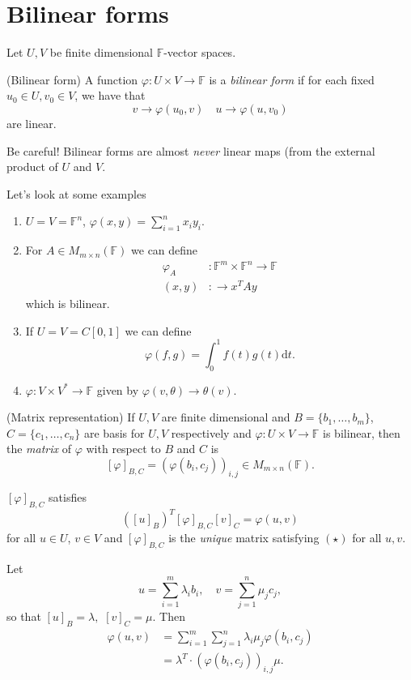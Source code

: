 \documentclass{article}
\newcommand{\F}{\mathbb{F}}
\begin{document}
\section{Bilinear forms}
Let $ U,V $ be finite dimensional $ \F $-vector spaces.
\begin{definition}
	(Bilinear form) A function $ \varphi:U\times V\to \F $ is a \textit{bilinear form} if for each fixed $ u_0\in U, v_0\in V $, we have that
	\[
	  v\to \varphi(u_0,v)\quad u\to \varphi(u,v_0)
	\]
	are linear.
\end{definition}
\begin{remark}
	Be careful! Bilinear forms are almost \textit{never} linear maps (from the external product of $ U $ and $ V $.
\end{remark}
Let's look at some examples
\begin{enumerate}
	\item $ U=V=\F^n $, $ \varphi(x,y)=\sum_{i=1}^n x_iy_i $.
	\item For $ A\in M_{m\times n}(\F)$ we can define
		\begin{align*}
			\varphi_A &:\F^m\times \F^n \to \F\\
			(x,y) &: \to x^TAy
		\end{align*}
		which is bilinear.
	\item If $ U=V=C[0,1] $ we can define
		\[
		  \varphi(f,g)=\int_0^1f(t)g(t)\mathrm dt.
		\]
	\item $ \varphi:V\times V^*\to \F $ given by $ \varphi(v,\theta)\to \theta(v) $.
\end{enumerate}
\begin{definition}
	(Matrix representation) If $ U,V $ are finite dimensional and $ B=\{b_1,\dots, b_m\} $, $ C=\{c_1,\dots, c_n\} $ are basis for $ U,V $ respectively and $ \varphi:U\times V\to \F $ is bilinear, then the \textit{matrix} of $ \varphi $ with respect to $ B $ and $ C $ is
	\[
		[\varphi]_{B,C}=(\varphi(b_i,c_j))_{i,j}\in M_{m\times n}(\F).
	\]
\end{definition}
\begin{proposition}
	$ [\varphi]_{B,C} $ satisfies
	\[
		([u]_B)^T[\varphi]_{B,C}[v]_C=\varphi(u,v)\tag{\star}
	\]
for all $ u\in U $, $ v\in V $ and $ [\varphi]_{B,C} $ is the \textit{unique} matrix satisfying $ (\star) $ for all $ u,v $.
\end{proposition}
\pf Let
\[
	u=\sum_{i=1}^m\lambda_ib_i,\quad v=\sum_{j=1}^n\mu_jc_j,
\]
so that $ [u]_B=\lambda, $ $ [v]_C=\mu $. Then
\begin{align*}
	\varphi(u,v)&=\sum_{i=1}^m\sum_{j=1}^n\lambda_i\mu_j\varphi(b_i,c_j)\\
		    &=\lambda^T\cdot(\varphi(b_i,c_j))_{i,j}\mu.
\end{align*}
\end{document}

